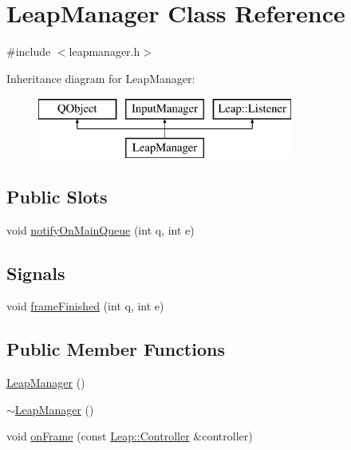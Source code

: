 \hypertarget{class_leap_manager}{\section{Leap\+Manager Class Reference}
\label{class_leap_manager}
}


{\ttfamily \#include $<$leapmanager.\+h$>$}

Inheritance diagram for Leap\+Manager\+:\begin{figure}[H]
\begin{center}
\leavevmode
\includegraphics[height=2.000000cm]{class_leap_manager}
\end{center}
\end{figure}
\subsection*{Public Slots}
\begin{DoxyCompactItemize}
\item 
void \hyperlink{class_leap_manager_a5d50198b53659afa29f93ab38d6f730a}{notify\+On\+Main\+Queue} (int q, int e)
\end{DoxyCompactItemize}
\subsection*{Signals}
\begin{DoxyCompactItemize}
\item 
void \hyperlink{class_leap_manager_aaf97456260cb9f139ff7bf3771877b0a}{frame\+Finished} (int q, int e)
\end{DoxyCompactItemize}
\subsection*{Public Member Functions}
\begin{DoxyCompactItemize}
\item 
\hyperlink{class_leap_manager_a5b784234d2e338255e7a32c1cb40c535}{Leap\+Manager} ()
\item 
\hyperlink{class_leap_manager_ae6740e093904a960b0ac200e66596625}{$\sim$\+Leap\+Manager} ()
\item 
void \hyperlink{class_leap_manager_ad50649a573f5176b9bfcb4407ea7efd3}{on\+Frame} (const \hyperlink{class_leap_1_1_controller}{Leap\+::\+Controller} \&controller)
\end{DoxyCompactItemize}
